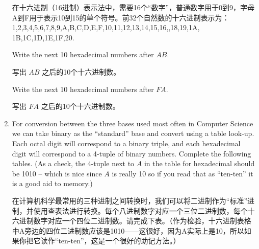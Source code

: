 \begin{enumerate}
    在十六进制（16进制）表示法中，需要16个“数字”，普通数字用于0到9，字母A到F用于表示10到15的单个符号。前32个自然数的十六进制表示为：
    1,2,3,4,5,6,7,8,9,A,B,C,D,E,F,10,11,12,13,14,15,16,,18,19,1A,
    1B,1C,1D,1E,1F,20.
  
    Write the next 10 hexadecimal numbers after $AB$.
    
    写出 $AB$ 之后的10个十六进制数。
  
    Write the next 10 hexadecimal numbers after $FA$.
    
    写出 $FA$ 之后的10个十六进制数。
    
  
  \wbvfill
  
  \workbookpagebreak
  
  \item For conversion between the three bases used most often in 
  Computer Science we can take binary as the ``standard'' base and 
  convert using a table look-up.
  Each octal digit will correspond 
  to a binary triple, and each hexadecimal digit will correspond to 
  a 4-tuple of binary numbers.
  Complete the following tables.  
  (As a check, the 4-tuple next to $A$ in the table for
  hexadecimal should be 1010 -- which is nice since $A$ 
  is really 10 so if you read that as ``ten-ten'' it is a good 
  aid to memory.)
  
  在计算机科学最常用的三种进制之间转换时，我们可以将二进制作为“标准”进制，并使用查表法进行转换。每个八进制数字对应一个三位二进制数，每个十六进制数字对应一个四位二进制数。请完成下表。（作为检验，十六进制表格中A旁边的四位二进制数应该是1010——这很好，因为A实际上是10，所以如果你把它读作“ten-ten”，这是一个很好的助记方法。）
  

\end{enumerate}
